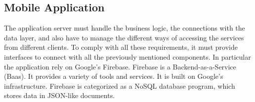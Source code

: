 \subsection{Mobile Application}
The application server must handle the business logic, the connections with the
data layer, and also have to manage the different ways of accessing the services
from different clients. To comply with all these requirements, it must provide
interfaces to connect with all the previously mentioned components.
In particular the application rely on Google's Firebase.
Firebase is a Backend-as-a-Service (Baas). It provides a variety of tools and services. It is built on Google’s infrastructure.
Firebase is categorized as a NoSQL database program, which stores data in JSON-like documents.
